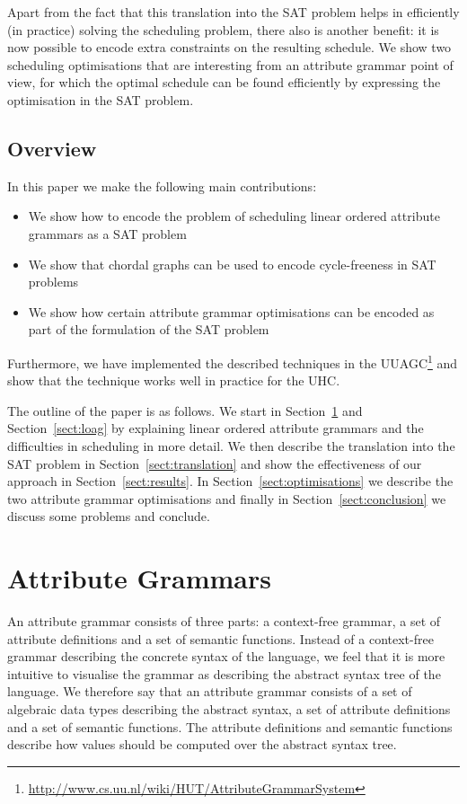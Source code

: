 \documentclass{llncs}
\newcommand{\sectref}[1]{Section~\ref{#1}}
\begin{document}
Apart from the fact that this translation into the SAT problem helps in efficiently (in practice) solving the scheduling problem, there also is another benefit: it is now possible to encode extra constraints on the resulting schedule. We show two scheduling optimisations that are interesting from an attribute grammar point of view, for which the optimal schedule can be found efficiently by expressing the optimisation in the SAT problem.

\subsection{Overview}
In this paper we make the following main contributions:
\begin{itemize}
\item We show how to encode the problem of scheduling linear ordered attribute grammars as a SAT problem
\item We show that chordal graphs can be used to encode cycle-freeness in SAT problems
\item We show how certain attribute grammar optimisations can be encoded as part of the formulation of the SAT problem
\end{itemize}
Furthermore, we have implemented the described techniques in the UUAGC\footnote{\url{http://www.cs.uu.nl/wiki/HUT/AttributeGrammarSystem}} \cite{combinator-languages} and show that the technique works well in practice for the UHC.

The outline of the paper is as follows. We start in \sectref{sect:ag} and \sectref{sect:loag} by explaining linear ordered attribute grammars and the difficulties in scheduling in more detail. We then describe the translation into the SAT problem in \sectref{sect:translation} and show the effectiveness of our approach in \sectref{sect:results}. In \sectref{sect:optimisations} we describe the two attribute grammar optimisations and finally in \sectref{sect:conclusion} we discuss some problems and conclude.


\section{Attribute Grammars} \label{sect:ag}
An attribute grammar consists of three parts: a context-free grammar, a set of attribute definitions and a set of semantic functions. Instead of a context-free grammar describing the concrete syntax of the language, we feel that it is more intuitive to visualise the grammar as describing the abstract syntax tree of the language. We therefore say that an attribute grammar consists of a set of algebraic data types describing the abstract syntax, a set of attribute definitions and a set of semantic functions. The attribute definitions and semantic functions describe how values should be computed over the abstract syntax tree.
\end{document}
